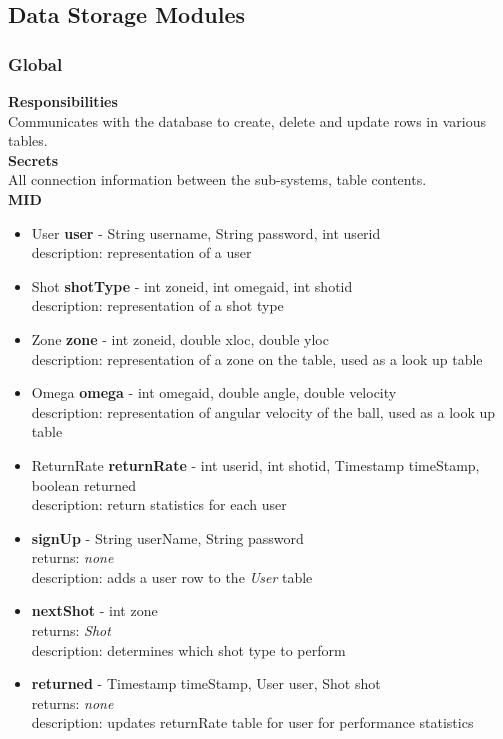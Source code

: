 \documentclass[11pt]{article}
\begin{document}
\subsection{Data Storage Modules}
\subsubsection*{Global}
\textbf{Responsibilities} \\
Communicates with the database to create, delete and update rows in various tables.  \\
\textbf{Secrets} \\
All connection information between the sub-systems, table contents.\\
\textbf{MID} \\
\begin{itemize}
\item User \textbf{user} - String user\textunderscore name, String password, int user\textunderscore id \\ description: representation of a user
\item Shot \textbf{shotType} - int zone\textunderscore id, int omega\textunderscore id, int shot\textunderscore id \\ description: representation of a shot type
\item Zone \textbf{zone} -  int zone\textunderscore id, double x\textunderscore loc, double y\textunderscore loc \\ description: representation of a zone on the table, used as a look up table
\item Omega \textbf{omega} - int omega\textunderscore id, double angle, double velocity \\ description: representation of angular velocity of the ball, used as a look up table
\item ReturnRate \textbf{returnRate} - int user\textunderscore id, int shot\textunderscore id,  Timestamp timeStamp, boolean returned \\ description: return statistics for each user
\item \textbf{signUp} - String userName, String password \\ returns: \textit{none} \\ description: adds a user row to the \textit{User} table
\item \textbf{nextShot} - int zone \\ returns: \textit{Shot} \\ description: determines which shot type to perform
\item \textbf{returned} - Timestamp timeStamp, User user, Shot shot \\ returns: \textit{none} \\ description: updates returnRate table for user for performance statistics
\end{itemize}
\end{document}
